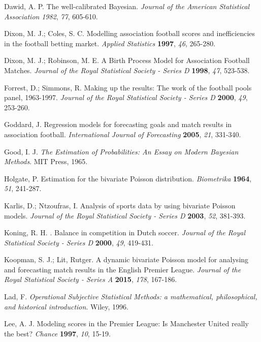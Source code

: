 \documentclass[journal,article,accept,moreauthors,pdftex,12pt,a4paper]{mdpi}
\begin{document}
\begin{thebibliography}{999}
			 Dawid, A. P. The well-calibrated Bayesian.
			{\em Journal of the American Statistical Association} {\em 1982}, {\em 77}, 605-610.
			
			 Dixon, M. J.; Coles, S. C. Modelling association football scores and inefficiencies in the football betting market. {\em Applied Statistics} {\bf 1997}, {\em 46}, 265-280.
			
			 Dixon, M. J.; Robinson, M. E. A Birth Process Model for Association Football Matches. {\em Journal of the Royal Statistical Society - Series D}
			{\bf 1998}, {\em 47}, 523-538.
			
			 Forrest, D.; Simmons, R. Making up the results: The work
			of the football pools panel, 1963-1997. {\em Journal of the Royal Statistical Society - Series D} {\bf 2000}, {\em 49}, 253-260.
			
			Goddard, J. Regression models for forecasting goals and match
			results in association football. {\em International Journal of
				Forecasting} {\bf 2005}, {\em 21}, 331-340.

			Good, I. J. {\em The Estimation of Probabilities: An Essay on Modern Bayesian Methods}. MIT Press, 1965.
			
			Holgate, P. Estimation for the bivariate Poisson distribution. {\em Biometrika} {\bf 1964}, {\em 51}, 241-287.
			
			Karlis, D.; Ntzoufras, I. Analysis of sports data by using bivariate
			Poisson models. {\em Journal of the Royal Statistical Society - Series D} {\bf 2003}, {\em 52}, 381-393.
			
			Koning, R. H. . Balance in competition in Dutch soccer. {\em Journal of the Royal Statistical Society - Series D} {\bf 2000}, {\em 49}, 419-431.
			
			Koopman, S. J.; Lit, Rutger. A dynamic bivariate Poisson model for
			analysing and forecasting match results in the English Premier
			League. {\em Journal of the Royal Statistical Society - Series A}
			{\bf 2015}, {\em 178}, 167-186.
			
			Lad, F. {\it Operational Subjective Statistical Methods: a mathematical,
				philosophical, and historical introduction}. Wiley, 1996.
			
			Lee, A. J. Modeling scores in the Premier League: Is Manchester United really the best? {\em Chance} {\bf 1997}, {\em 10}, 15-19.
			

\end{thebibliography}
\end{document}
